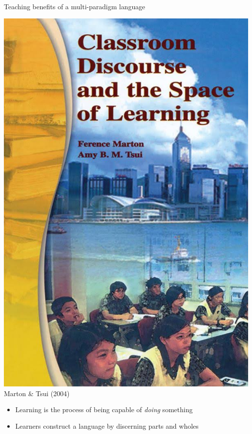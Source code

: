 \documentclass[aspectratio=169]{beamer}
\newenvironment{Slide}[1]%
  {\begin{frame}[environment=Slide]{#1}}
  {\end{frame}}%
\begin{document}
\begin{Slide}{Teaching benefits of a multi-paradigm language}
  \begin{minipage}{0.2\textwidth}
    \includegraphics[height=0.52\textheight]{Pictures/marton}\\
    {\small Marton \& Tsui \newline (2004)}
  \end{minipage}%
  \begin{minipage}{0.85\textwidth}
    \begin{itemize}
      \item Learning is the process of being capable of \textit{doing} something
      \item Learners construct a language by discerning parts and wholes %

\end{itemize}
\end{minipage}
\end{Slide}
\end{document}

